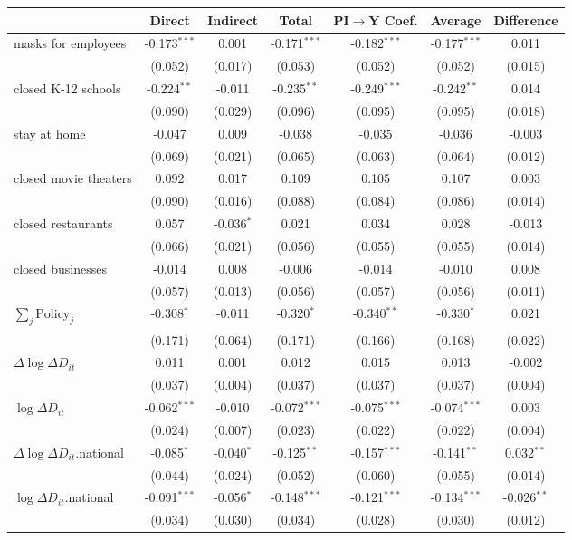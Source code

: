 
\begin{tabular}{lccccc|>{}c}
\toprule
  & Direct & Indirect & Total & PI$\to$Y Coef. & Average & Difference\\
\midrule
masks for employees & -0.173$^{***}$ & 0.001 & -0.171$^{***}$ & -0.182$^{***}$ & -0.177$^{***}$ & 0.011\\
 & (0.052) & (0.017) & (0.053) & (0.052) & (0.052) & (0.015)\\
closed K-12 schools & -0.224$^{**}$ & -0.011 & -0.235$^{**}$ & -0.249$^{***}$ & -0.242$^{**}$ & 0.014\\
 & (0.090) & (0.029) & (0.096) & (0.095) & (0.095) & (0.018)\\
stay at home & -0.047 & 0.009 & -0.038 & -0.035 & -0.036 & -0.003\\
 & (0.069) & (0.021) & (0.065) & (0.063) & (0.064) & (0.012)\\
closed movie theaters & 0.092 & 0.017 & 0.109 & 0.105 & 0.107 & 0.003\\
 & (0.090) & (0.016) & (0.088) & (0.084) & (0.086) & (0.014)\\
closed restaurants & 0.057 & -0.036$^{*}$ & 0.021 & 0.034 & 0.028 & -0.013\\
 & (0.066) & (0.021) & (0.056) & (0.055) & (0.055) & (0.014)\\
closed businesses & -0.014 & 0.008 & -0.006 & -0.014 & -0.010 & 0.008\\
 & (0.057) & (0.013) & (0.056) & (0.057) & (0.056) & (0.011)\\
$\sum_j \mathrm{Policy}_j$ & -0.308$^{*}$ & -0.011 & -0.320$^{*}$ & -0.340$^{**}$ & -0.330$^{*}$ & 0.021\\
 & (0.171) & (0.064) & (0.171) & (0.166) & (0.168) & (0.022)\\
$\Delta \log \Delta D_{it}$ & 0.011 & 0.001 & 0.012 & 0.015 & 0.013 & -0.002\\
 & (0.037) & (0.004) & (0.037) & (0.037) & (0.037) & (0.004)\\
$\log \Delta D_{it}$ & -0.062$^{***}$ & -0.010 & -0.072$^{***}$ & -0.075$^{***}$ & -0.074$^{***}$ & 0.003\\
 & (0.024) & (0.007) & (0.023) & (0.022) & (0.022) & (0.004)\\
$\Delta \log \Delta D_{it}$.national & -0.085$^{*}$ & -0.040$^{*}$ & -0.125$^{**}$ & -0.157$^{***}$ & -0.141$^{**}$ & 0.032$^{**}$\\
 & (0.044) & (0.024) & (0.052) & (0.060) & (0.055) & (0.014)\\
$\log \Delta D_{it}$.national & -0.091$^{***}$ & -0.056$^{*}$ & -0.148$^{***}$ & -0.121$^{***}$ & -0.134$^{***}$ & -0.026$^{**}$\\
 & (0.034) & (0.030) & (0.034) & (0.028) & (0.030) & (0.012)\\
\bottomrule
\end{tabular}